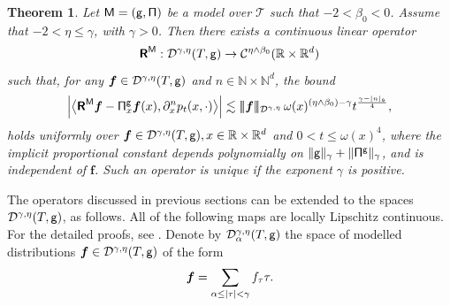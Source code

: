 \documentclass[10pt, reqno]{amsart}
\numberwithin{subsection}{section}
\numberwithin{subsubsection}{subsection}
\numberwithin{equation}{section} %
\theoremstyle{mystyle}
\newtheorem{thm}{Theorem}
\theoremstyle{mystyle2}
\theoremstyle{mystyle3}
\newcommand{\trino}[1]{|\!|\!|#1|\!|\!|}
\newcommand{\bsf}{\boldsymbol{f}}
\newcommand{\mfs}{\mathfrak{s}}
\newcommand\bbN{\mathbb{N}}
\newcommand\bbR{\mathbb{R}}
\newcommand{\mcC}{\mathcal{C}}
\newcommand{\mcD}{\mathcal{D}}
\begin{document}
\begin{thm}\label{thm singular reconstruction}
Let ${\sf M=(g,\Pi)}$ be a model over $\mathscr{T}$ such that $-2<\beta_0<0$. Assume that $-2<\eta\le\gamma$, with $\gamma>0$. Then there exists a continuous linear operator
$$
\textbf{\textsf{R}}^{\sf M}:\mcD^{\gamma,\eta}(T,{\sf g}) \to \mcC^{\eta\wedge\beta_0}(\bbR\times\bbR^d)
$$
such that, for any $\bsf\in\mcD^{\gamma,\eta}(T,{\sf g})$ and $n\in\bbN\times\bbN^d$, the bound
\begin{equation}
\label{EqSingularReconstructionCondition}
\Big|\big\langle \textbf{\textsf{R}}^{\sf M}\bsf - {\sf\Pi}_x^{\sf g}\bsf(x) , \partial_x^np_t(x,\cdot)\big\rangle\Big|  \lesssim  \trino{\bsf}_{\mcD^{\gamma,\eta}} \, \omega(x)^{(\eta\wedge\beta_0)-\gamma} t^{\frac{\gamma-|n|_\mfs}4},
\end{equation}
holds uniformly over $\bsf\in\mcD^{\gamma,\eta}(T, {\sf g}), x\in\bbR\times\bbR^d$ and $0<t\le\omega(x)^4$, where the implicit proportional constant depends polynomially on $\|{\sf g}\|_\gamma+\|{\sf\Pi}^{\sf g}\|_\gamma$, and is independent of $\bsf$. Such an operator is unique if the exponent $\gamma$ is positive.
\end{thm}

\medskip

The operators discussed in previous sections can be extended to the spaces $\mcD^{\gamma,\eta}(T,\sf g)$, as follows. All of the following maps are locally Lipschitz continuous. For the detailed proofs, see \cite[Propositions 6.12, 6.13, 6.15, and 6.16]{Hai14}. Denote by $\mcD_\alpha^{\gamma,\eta}(T,\sf g)$ the space of modelled distributions $\bsf\in\mcD^{\gamma,\eta}(T,\sf g)$ of the form
\begin{align}\label{def D_a^ge}
\bsf=\sum_{\alpha\le|\tau|<\gamma}f_\tau\tau.   \vspace{0.1cm}
\end{align}
\end{document}
